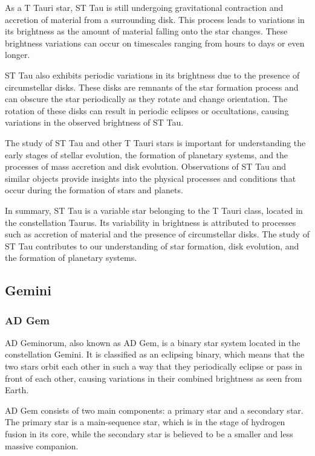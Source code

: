 As a T Tauri star, ST Tau is still undergoing gravitational contraction and accretion of material from a surrounding disk. This process leads to variations in its brightness as the amount of material falling onto the star changes. These brightness variations can occur on timescales ranging from hours to days or even longer.

ST Tau also exhibits periodic variations in its brightness due to the presence of circumstellar disks. These disks are remnants of the star formation process and can obscure the star periodically as they rotate and change orientation. The rotation of these disks can result in periodic eclipses or occultations, causing variations in the observed brightness of ST Tau.

The study of ST Tau and other T Tauri stars is important for understanding the early stages of stellar evolution, the formation of planetary systems, and the processes of mass accretion and disk evolution. Observations of ST Tau and similar objects provide insights into the physical processes and conditions that occur during the formation of stars and planets.

In summary, ST Tau is a variable star belonging to the T Tauri class, located in the constellation Taurus. Its variability in brightness is attributed to processes such as accretion of material and the presence of circumstellar disks. The study of ST Tau contributes to our understanding of star formation, disk evolution, and the formation of planetary systems.

\subsection{Gemini}

\subsubsection*{ AD Gem }
AD Geminorum, also known as AD Gem, is a binary star system located in the constellation Gemini. It is classified as an eclipsing binary, which means that the two stars orbit each other in such a way that they periodically eclipse or pass in front of each other, causing variations in their combined brightness as seen from Earth.

AD Gem consists of two main components: a primary star and a secondary star. The primary star is a main-sequence star, which is in the stage of hydrogen fusion in its core, while the secondary star is believed to be a smaller and less massive companion.

